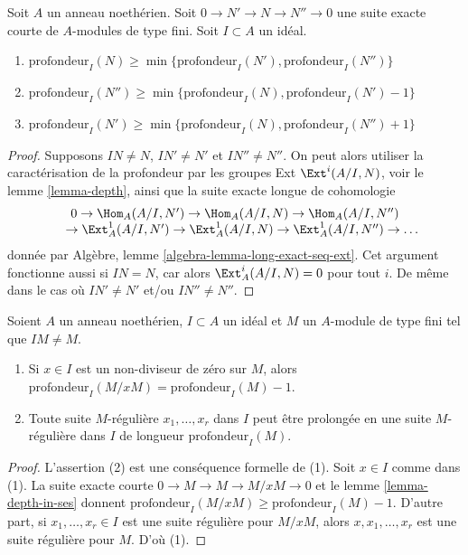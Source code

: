\begin{lemma}
\label{lemma-depth-in-ses}
Soit $A$ un anneau noethérien. Soit $0 \to N' \to N \to N'' \to 0$
une suite exacte courte de $A$-modules de type fini.
Soit $I \subset A$ un idéal.
\begin{enumerate}
\item
$\text{profondeur}_I(N) \geq \min\{\text{profondeur}_I(N'), \text{profondeur}_I(N'')\}$
\item
$\text{profondeur}_I(N'') \geq \min\{\text{profondeur}_I(N), \text{profondeur}_I(N') - 1\}$
\item
$\text{profondeur}_I(N') \geq \min\{\text{profondeur}_I(N), \text{profondeur}_I(N'') + 1\}$
\end{enumerate}
\end{lemma}

\begin{proof}
Supposons $IN \not = N$, $IN' \not = N'$ et $IN'' \not = N''$.
On peut alors utiliser la caractérisation de la profondeur
par les groupes Ext $\Ext^i(A/I, N)$, voir le lemme \ref{lemma-depth},
ainsi que la suite exacte longue de cohomologie
$$
\begin{matrix}
0
\to \Hom_A(A/I, N')
\to \Hom_A(A/I, N)
\to \Hom_A(A/I, N'')
\\
\phantom{0\ }
\to \Ext^1_A(A/I, N')
\to \Ext^1_A(A/I, N)
\to \Ext^1_A(A/I, N'')
\to \ldots
\end{matrix}
$$
donnée par Algèbre, lemme \ref{algebra-lemma-long-exact-seq-ext}.
Cet argument fonctionne aussi si $IN = N$,
car alors $\Ext^i_A(A/I, N) = 0$ pour tout $i$.
De même dans le cas où $IN' \not = N'$ et/ou $IN'' \not = N''$.
\end{proof}

\begin{lemma}
\label{lemma-depth-drops-by-one}
Soient $A$ un anneau noethérien, $I \subset A$ un idéal et $M$
un $A$-module de type fini tel que $IM \not = M$.
\begin{enumerate}
\item Si $x \in I$ est un non-diviseur de zéro sur $M$, alors
$\text{profondeur}_I(M/xM) = \text{profondeur}_I(M) - 1$.
\item Toute suite $M$-régulière $x_1, \ldots, x_r$ dans $I$
peut être prolongée en une suite $M$-régulière dans $I$
de longueur $\text{profondeur}_I(M)$.
\end{enumerate}
\end{lemma}

\begin{proof}
L'assertion (2) est une conséquence formelle de (1).
Soit $x \in I$ comme dans (1). La suite exacte courte $0 \to M \to M \to M/xM \to 0$
et le lemme \ref{lemma-depth-in-ses} donnent $\text{profondeur}_I(M/xM) \geq \text{profondeur}_I(M) - 1$.
D'autre part, si $x_1, \ldots, x_r \in I$ est une suite régulière pour $M/xM$,
alors $x, x_1, \ldots, x_r$ est une suite régulière pour $M$. D'où (1).
\end{proof}

